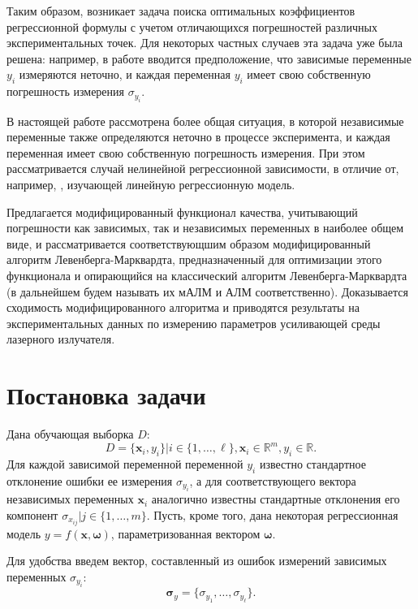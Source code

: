 \documentclass[tikz,11pt,a4paper]{article}
\newcommand{\bomega}{\boldsymbol{\omega}}
\begin{document}
Таким образом, возникает задача поиска оптимальных коэффициентов регрессионной
формулы с учетом отличающихся погрешностей различных экспериментальных точек.
Для некоторых частных случаев эта задача уже была решена: например, 
в работе \cite{jukic2013nonlinear} вводится предположение, что зависимые переменные $y_i$ измеряются
неточно, и каждая переменная $y_i$ имеет свою собственную погрешность измерения
$\sigma_{y_i}$.

В настоящей работе рассмотрена более общая ситуация, в которой независимые
переменные также определяются неточно в процессе эксперимента, и каждая переменная
имеет свою собственную погрешность измерения. При этом рассматривается случай
нелинейной регрессионной зависимости, в отличие от, например,
\cite{kiryati2000heteroscedastic}, изучающей линейную регрессионную модель.

Предлагается модифицированный
функционал качества, учитывающий погрешности как зависимых, так и независимых
переменных в наиболее общем виде, и рассматривается соответствующшим образом
модифицированный алгоритм Левенберга-Марквардта, предназначенный для оптимизации
этого функционала и опирающийся на классический алгоритм Левенберга-Марквардта
(в дальнейшем будем называть их мАЛМ и АЛМ соответственно).
Доказывается сходимость модифицированного алгоритма и приводятся
результаты на экспериментальных данных по измерению параметров усиливающей
среды лазерного излучателя.

\section{Постановка задачи}

Дана обучающая выборка $D$:
\begin{equation}
  D = \{ \mathbf{x}_i, y_i \} | i \in \{ 1, \dots, \ell \}, \mathbf{x}_i \in \mathbb{R}^m, y_i \in \mathbb{R}.
  \label{eq:d}
\end{equation}
Для каждой зависимой переменной переменной $y_i$ известно
стандартное отклонение ошибки ее измерения $\sigma_{y_i}$, а для соответствующего
вектора независимых переменных $\mathbf{x}_i$ аналогично известны стандартные
отклонения его компонент $\sigma_{x_{ij}} | j \in \{ 1, \dots, m \}$.
Пусть, кроме того, дана некоторая регрессионная модель
$y = f (\mathbf{x}, \bomega)$, параметризованная вектором $\bomega$.

Для удобства введем вектор, составленный из ошибок измерений зависимых переменных
$\sigma_{y_i}$:
\[
  \boldsymbol{\sigma}_y = \{ \sigma_{y_1}, \dots, \sigma_{y_{\ell}} \}.
\]
\end{document}
